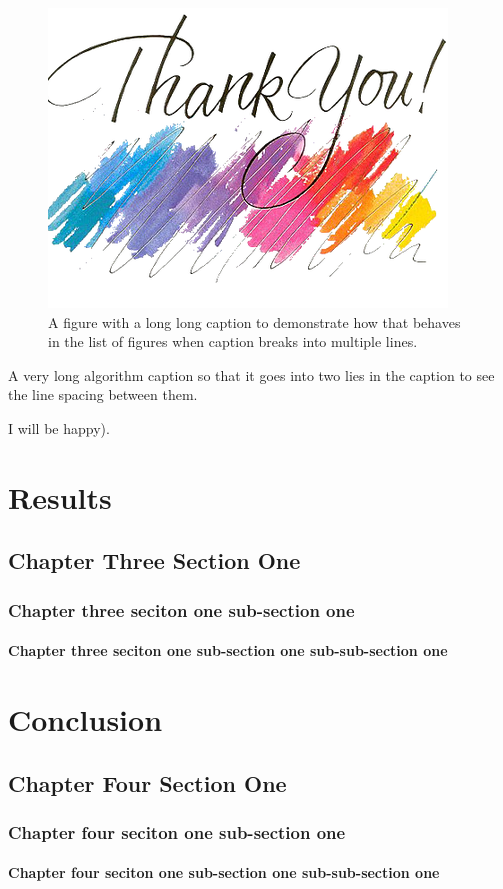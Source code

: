 \begin{figure}[htb!]
	\centering
		\includegraphics{thank_you}
	\caption{A figure with a long long caption to demonstrate how that behaves in the list of figures when caption breaks into multiple lines.}
\end{figure}



\begin{algorithm}[htb!]
	\caption{A very long algorithm caption so that it goes into two lies in the caption to see the line spacing between them.}
	\begin{algorithmic}[1]
					\State I will be happy).
				\EndIf
	\end{algorithmic}
\end{algorithm}



\chapter{Results}
\section{Chapter Three Section One}
\subsection{Chapter three seciton one sub-section one}
\subsubsection{Chapter three seciton one sub-section one sub-sub-section one}


\chapter{Conclusion}
\section{Chapter Four Section One}
\subsection{Chapter four seciton one sub-section one}
\subsubsection{Chapter four seciton one sub-section one sub-sub-section one}

